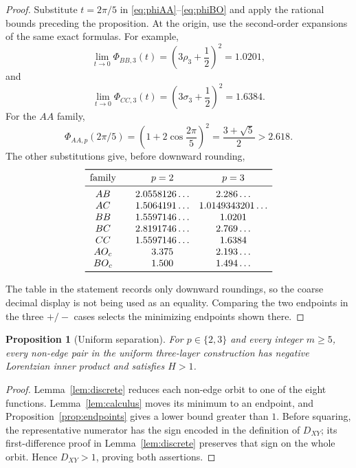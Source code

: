 \documentclass{amsart}
\newtheorem{prop}[lemma]{Proposition}
\newcommand{\tablegap}{\par\vspace{0.2cm}}
\begin{document}
\begin{proof}
Substitute \(t=2\pi/5\) in
\eqref{eq:phiAA}--\eqref{eq:phiBO} and apply the rational bounds preceding
the proposition.  At the origin, use the second-order expansions of the
same exact formulas.  For example,
\[
 \lim_{t\to0}\Phi_{BB,3}(t)
 =\left(3\rho_3+\frac12\right)^2=1.0201,
\]
and
\[
 \lim_{t\to0}\Phi_{CC,3}(t)
 =\left(3\sigma_3+\frac12\right)^2=1.6384.
\]
For the \(AA\) family,
\[
 \Phi_{AA,p}(2\pi/5)
 =\left(1+2\cos\frac{2\pi}{5}\right)^2
 =\frac{3+\sqrt5}{2}>2.618.
\]
The other substitutions give, before downward rounding,
\begingroup
\small
\[
\begin{array}{c@{\qquad}cc}
\toprule
\text{family}&p=2&p=3\\
\midrule
AB&2.0558126\ldots&2.286\ldots\\
AC&1.5064191\ldots&1.0149343201\ldots\\
BB&1.5597146\ldots&1.0201\\
BC&2.8191746\ldots&2.769\ldots\\
CC&1.5597146\ldots&1.6384\\
AO_c&3.375&2.193\ldots\\
BO_c&1.500&1.494\ldots\\
\bottomrule
\end{array}
\]
\endgroup
\tablegap
The table in the statement records only downward roundings, so the coarse
decimal display is not being used as an equality.  Comparing the two
endpoints in the three \(+/-\) cases selects the minimizing endpoints shown
there.
\end{proof}

\begin{prop}[Uniform separation]
For \(p\in\{2,3\}\) and every integer \(m\geq5\), every non-edge pair in
the uniform three-layer construction has negative Lorentzian inner product
and satisfies \(H>1\).
\end{prop}

\begin{proof}
Lemma~\ref{lem:discrete} reduces each non-edge orbit to one of the eight
functions.  Lemma~\ref{lem:calculus} moves its minimum to an endpoint, and
Proposition~\ref{prop:endpoints} gives a lower bound greater than \(1\).
Before squaring, the representative numerator has the sign encoded in the
definition of \(D_{XY}\); its first-difference proof in
Lemma~\ref{lem:discrete} preserves that sign on the whole orbit.  Hence
\(D_{XY}>1\), proving both assertions.
\end{proof}
\end{document}
